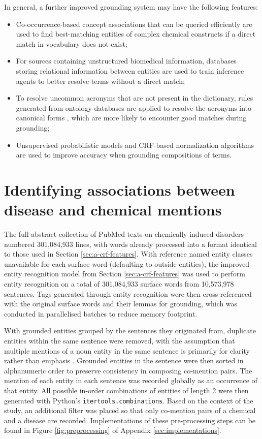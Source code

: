 \documentclass[10pt, oneside]{article}
\begin{document}
In general, a further improved grounding system may have the following features:
\begin{itemize}
	\item Co-occurrence-based concept associations that can be queried efficiently \cite{tsuruoka2008facta} are used to find best-matching entities of complex chemical constructs if a direct match in vocabulary does not exist;
	\item For sources containing unstructured biomedical information, databases storing relational information \cite{kim2005biocontrasts} between entities are used to train inference agents \cite{shin2015incremental} to better resolve terms without a direct match;
	\item To resolve uncommon acronyms that are not present in the dictionary, rules generated from ontology databases are applied to resolve the acronyms into canonical forms \cite{naderi2011organismtagger}, which are more likely to encounter good matches during grounding;
	\item Unsupervised probabilistic models \cite{pecina2010lexical} and CRF-based normalization algorithms \cite{lee2016audis} are used to improve accuracy when grounding compositions of terms.
\end{itemize}

\section{Identifying associations between disease and chemical mentions}

The full abstract collection of PubMed texts on chemically induced disorders numbered 301,084,933 lines, with words already processed into a format identical to those used in Section \ref{sec:a-crf-features}. With reference named entity classes unavailable for each surface word (defaulting to outside entities), the improved entity recognition model from Section \ref{sec:a-crf-features} was used to perform entity recognition on a total of 301,084,933 surface words from 10,573,978 sentences. Tags generated through entity recognition were then cross-referenced with the original surface words and their lemmas for grounding, which was conducted in parallelised batches to reduce memory footprint. 

With grounded entities grouped by the sentences they originated from, duplicate entities within the same sentence were removed, with the assumption that multiple mentions of a noun entity in the same sentence is primarily for clarity rather than emphasis \cite{clark1979search}. Grounded entities in the sentence were then sorted in alphanumeric order to preserve consistency in composing co-mention pairs. The mention of each entity in each sentence was recorded globally as an occurrence of that entity. All possible in-order combinations of entities of length 2 were then generated with Python's \verb|itertools.combinations|. Based on the context of the study, an additional filter was placed so that only co-mention pairs of a chemical and a disease are recorded. Implementations of these pre-processing steps can be found in Figure \ref{fig:preprocessing} of Appendix \ref{sec:implementations}.
\end{document}
